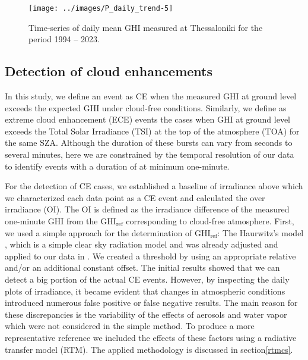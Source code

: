 \documentclass[preprint, 5p,
authoryear]{elsarticle} %
\begin{document}
\begin{figure}

{\centering \texttt{[image: ../images/P\_daily\_trend-5]} 

}

\caption{Time-series of daily mean GHI measured at Thessaloniki for the period 1994 -- 2023.}\label{fig:CLB-daily}
\end{figure}

\hypertarget{detection-of-cloud-enhancements}{%
\subsection{Detection of cloud
enhancements}\label{detection-of-cloud-enhancements}}

In this study, we define an event as CE when the measured GHI at ground
level exceeds the expected GHI under cloud-free conditions. Similarly,
we define as extreme cloud enhancement (ECE) events the cases when GHI
at ground level exceeds the Total Solar Irradiance (TSI) at the top of
the atmosphere (TOA) for the same SZA. Although the duration of these
bursts can vary from seconds to several minutes, here we are constrained
by the temporal resolution of our data to identify events with a
duration of at minimum one-minute.

For the detection of CE cases, we established a baseline of irradiance
above which we characterized each data point as a CE event and
calculated the over irradiance (OI). The OI is defined as the irradiance
difference of the measured one-minute GHI from the
\(\text{GHI}_\text{ref}\) corresponding to cloud-free atmosphere. First,
we used a simple approach for the determination of
\(\text{GHI}_\text{ref}\): The Haurwitz's model \citep{Haurwitz1945},
which is a simple clear sky radiation model and was already adjusted and
applied to our data in \citet{Natsis2023}. We created a threshold by
using an appropriate relative and/or an additional constant offset. The
initial results showed that we can detect a big portion of the actual CE
events. However, by inspecting the daily plots of irradiance, it became
evident that changes in atmospheric conditions introduced numerous false
positive or false negative results. The main reason for these
discrepancies is the variability of the effects of aerosols and water
vapor which were not considered in the simple method. To produce a more
representative reference we included the effects of these factors using
a radiative transfer model (RTM). The applied methodology is discussed
in section\nobreakspace{}\ref{rtmcs}.
\end{document}
